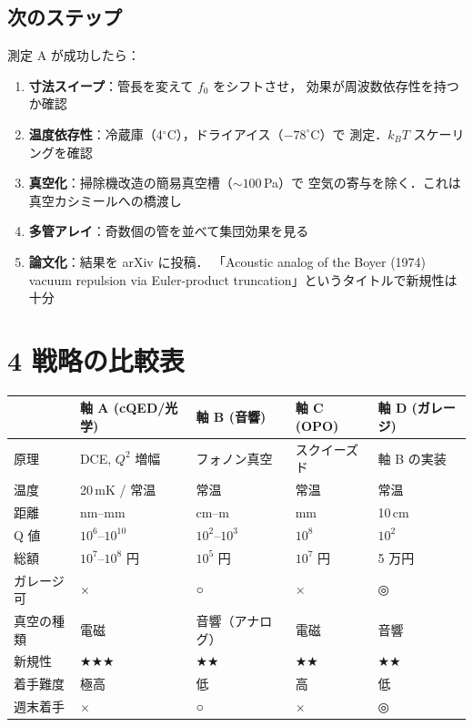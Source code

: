\documentclass[11pt,a4paper]{article}
\begin{document}
\subsection{次のステップ}

測定 A が成功したら：
\begin{enumerate}
\item \textbf{寸法スイープ}：管長を変えて $f_0$ をシフトさせ，
効果が周波数依存性を持つか確認
\item \textbf{温度依存性}：冷蔵庫（4$^\circ$C），ドライアイス（$-78^\circ$C）で
測定．$k_B T$ スケーリングを確認
\item \textbf{真空化}：掃除機改造の簡易真空槽（$\sim 100$\,Pa）で
空気の寄与を除く．これは真空カシミールへの橋渡し
\item \textbf{多管アレイ}：奇数個の管を並べて集団効果を見る
\item \textbf{論文化}：結果を arXiv に投稿．
「Acoustic analog of the Boyer (1974) vacuum repulsion via
Euler-product truncation」というタイトルで新規性は十分
\end{enumerate}

\section{4 戦略の比較表}

\begin{center}
\small
\begin{tabular}{lllll}
\toprule
 & 軸 A (cQED/光学) & 軸 B (音響) & 軸 C (OPO) & 軸 D (ガレージ) \\
\midrule
原理 & DCE, $Q^2$ 増幅 & フォノン真空 & スクイーズド & 軸 B の実装 \\
温度 & 20\,mK / 常温 & 常温 & 常温 & 常温 \\
距離 & nm--mm & cm--m & mm & 10\,cm \\
Q 値 & $10^6$--$10^{10}$ & $10^2$--$10^3$ & $10^8$ & $10^2$ \\
総額 & $10^7$--$10^8$ 円 & $10^5$ 円 & $10^7$ 円 & 5 万円 \\
ガレージ可 & × & ○ & × & ◎ \\
真空の種類 & 電磁 & 音響（アナログ）& 電磁 & 音響 \\
新規性 & ★★★ & ★★ & ★★ & ★★ \\
着手難度 & 極高 & 低 & 高 & 低 \\
\midrule
週末着手 & × & ○ & × & ◎ \\
\bottomrule
\end{tabular}
\end{center}
\end{document}
